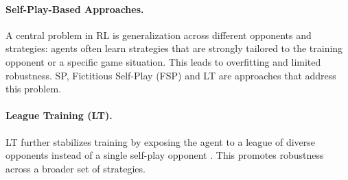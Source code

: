 \documentclass[10pt,twocolumn,letterpaper]{article}
\begin{document}
\paragraph{Self-Play-Based Approaches.}
A central problem in RL is generalization across different opponents and strategies: agents often learn strategies that are strongly tailored to the training opponent or a specific game situation. 
This leads to overfitting and limited robustness. 
SP, Fictitious Self-Play (FSP) and LT are approaches that address this problem. 

\paragraph{League Training (LT).}
LT further stabilizes training by exposing the agent to a league of diverse opponents instead of a single self-play opponent \cite{vinyals2019alphastar}.
This promotes robustness across a broader set of strategies.

\end{document}
